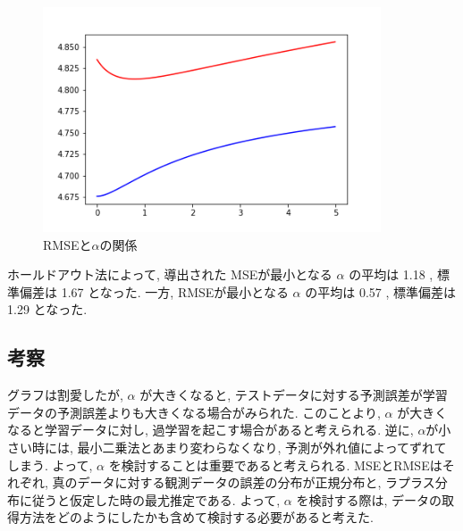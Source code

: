 \documentclass{jsarticle}
\begin{document}
\begin{figure}
\begin{center}
\label{rmse_al}
\caption{RMSEと$\alpha$の関係}
\includegraphics[width=10cm]{prog/rmse.png}
\end{center}
\end{figure}


ホールドアウト法によって, 導出された MSEが最小となる $\alpha$ の平均は 1.18 , 
標準偏差は 1.67 となった.
一方, RMSEが最小となる $\alpha$ の平均は 0.57 , 標準偏差は 1.29 となった. 




\subsection{考察}
グラフは割愛したが, $\alpha$ が大きくなると, テストデータに対する予測誤差が学習データの予測誤差よりも大きくなる場合がみられた.
このことより, $\alpha$ が大きくなると学習データに対し, 過学習を起こす場合があると考えられる.
逆に, $\alpha$が小さい時には, 最小二乗法とあまり変わらなくなり, 予測が外れ値によってずれてしまう.
よって, $\alpha$ を検討することは重要であると考えられる. 
MSEとRMSEはそれぞれ, 真のデータに対する観測データの誤差の分布が正規分布と, ラプラス分布に従うと仮定した時の最尤推定である.
よって, $\alpha$ を検討する際は, データの取得方法をどのようにしたかも含めて検討する必要があると考えた. 
\end{document}
